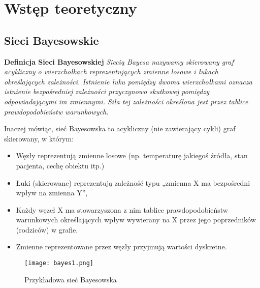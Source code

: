 

\section{Wstęp teoretyczny}

\subsection{Sieci Bayesowskie}

\textbf{Definicja Sieci Bayesowskiej}
\newline
\textit{Siecią Bayesa nazywamy skierowany graf acykliczny o wierzchołkach reprezentujących zmienne losowe i łukach określających zależności. Istnienie łuku pomiędzy dwoma wierzchołkami oznacza istnienie bezpośredniej zależności przyczynowo skutkowej pomiędzy odpowiadającymi im zmiennymi. Siła tej zależności określona jest przez tablice prawdopodobieństw warunkowych.}\newline

Inaczej mówiąc, sieć Bayesowska to acykliczny (nie zawierający cykli) graf skierowany, w którym:
\begin{itemize}
\item Węzły reprezentują zmienne losowe (np. temperaturę jakiegoś źródła, stan pacjenta, cechę obiektu itp.)
\item Łuki (skierowane) reprezentują zależność typu „zmienna X ma bezpośredni wpływ na zmienna Y”,
\item Każdy węzeł X ma stowarzyszona z nim tablice prawdopodobieństw warunkowych określających wpływ wywierany na X przez jego poprzedników (rodziców) w grafie.
\item Zmienne reprezentowane przez węzły przyjmują wartości dyskretne.
\end{itemize}

\begin{figure}[h!]
	\centering
	\texttt{[image: bayes1.png]}
	\label{bayes1}
	\caption{Przykładowa sieć Bayesowska}
\end{figure}

